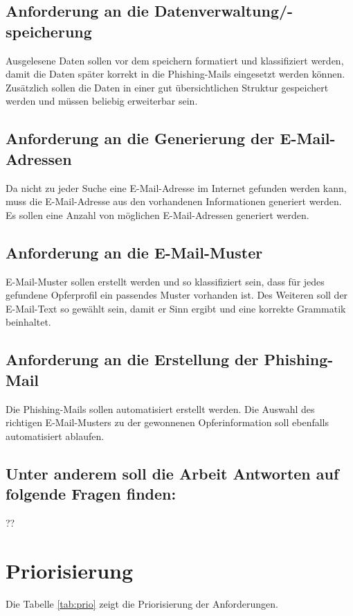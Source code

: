 	\subsection{Anforderung an die Datenverwaltung/-speicherung}
	Ausgelesene Daten sollen vor dem speichern formatiert und klassifiziert werden, damit die Daten später korrekt in die Phishing-Mails eingesetzt werden können. Zusätzlich sollen die Daten in einer gut übersichtlichen Struktur gespeichert werden und müssen beliebig erweiterbar sein.
	
	\subsection{Anforderung an die Generierung der E-Mail-Adressen}
	Da nicht zu jeder Suche eine E-Mail-Adresse im Internet gefunden werden kann, muss die E-Mail-Adresse aus den vorhandenen Informationen generiert werden. Es sollen eine Anzahl von möglichen E-Mail-Adressen generiert werden.
	
	\subsection{Anforderung an die E-Mail-Muster}
	E-Mail-Muster sollen erstellt werden und so klassifiziert sein, dass für jedes gefundene Opferprofil ein passendes Muster vorhanden ist. Des Weiteren soll der E-Mail-Text so gewählt sein, damit er Sinn ergibt und eine korrekte Grammatik beinhaltet.
	
	\subsection{Anforderung an die Erstellung der Phishing-Mail}
	Die Phishing-Mails sollen automatisiert erstellt werden. Die Auswahl des richtigen E-Mail-Musters zu der gewonnenen Opferinformation soll ebenfalls automatisiert ablaufen.
	
	\subsection{Unter anderem soll die Arbeit Antworten auf folgende Fragen finden:}
	??
\FloatBarrier
\section{Priorisierung} %
\label{sec:} %
Die Tabelle \ref{tab:prio} zeigt die Priorisierung der Anforderungen.

